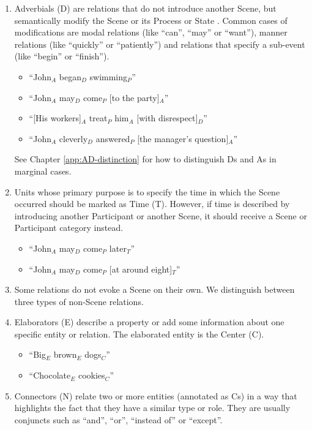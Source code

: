 \documentclass[11pt]{article}
\begin{document}
\begin{enumerate}
\item
Adverbials (D) are relations that do not introduce another Scene, but semantically modify the Scene or its Process or State . Common cases of modifications are modal relations (like ``can'', ``may'' or ``want''), manner relations (like ``quickly'' or ``patiently'') and relations that specify a sub-event (like ``begin'' or ``finish'').
\begin{itemize}
\item
``John$_A$ began$_D$ swimming$_P$''
\item
``John$_A$ may$_D$ come$_P$ [to the party]$_A$''
\item
``[His workers]$_A$ treat$_P$ him$_A$ [with disrespect]$_D$''
\item
``John$_A$ cleverly$_D$ answered$_P$ [the manager's question]$_A$''
\end{itemize}

See Chapter \ref{app:AD-distinction} for how to distinguish Ds and As in marginal cases.

\item
Units whose primary purpose is to specify the time in which the Scene occurred should be marked as Time (T). However, if time is described by introducing another Participant or another Scene, it should receive a Scene or Participant category instead.

\begin{itemize}
\item ``John$_A$ may$_D$ come$_P$ later$_T$''
\item ``John$_A$ may$_D$ come$_P$ [at around eight]$_T$''
\end{itemize}

\item
Some relations do not evoke a Scene on their own. We distinguish between three types of non-Scene relations.

\item
Elaborators (E) describe a property or add some information about one specific entity or relation. The elaborated entity is the Center (C).

\begin{itemize}
\item ``Big$_E$ brown$_E$ dogs$_C$''
\item ``Chocolate$_E$ cookies$_C$''
\end{itemize}

\item
Connectors (N) relate two or more entities (annotated as Cs) in a way that highlights the fact that they have a similar type or role. They are usually conjuncts such as ``and'', ``or'', ``instead of'' or ``except''.


\end{enumerate}
\end{document}

